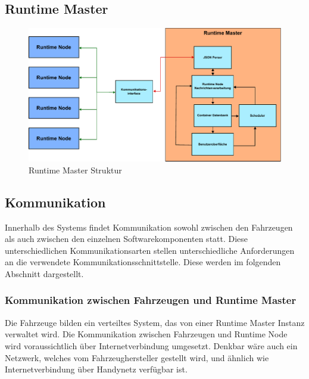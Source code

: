 \subsection{Runtime Master}

\begin{figure}[htbp]
	\centering
	\includegraphics[width=\textwidth]{./content/graphics/Runtime_Master_Arch.pdf}
	\caption{Runtime Master Struktur}
	\label{runtime master}
\end{figure}

\subsection{Kommunikation}

Innerhalb des Systems findet Kommunikation sowohl zwischen den Fahrzeugen als auch zwischen den einzelnen Softwarekomponenten statt. Diese unterschiedlichen Kommunikationsarten stellen unterschiedliche Anforderungen an die verwendete Kommunikationsschnittstelle. Diese werden im folgenden Abschnitt dargestellt.

\subsubsection{Kommunikation zwischen Fahrzeugen und Runtime Master}

Die Fahrzeuge bilden ein verteiltes System, das von einer Runtime Master Instanz verwaltet wird. Die Kommunikation zwischen Fahrzeugen und Runtime Node wird voraussichtlich über Internetverbindung umgesetzt. Denkbar wäre auch ein Netzwerk, welches vom Fahrzeughersteller gestellt wird, und ähnlich wie Internetverbindung über Handynetz verfügbar ist. 



